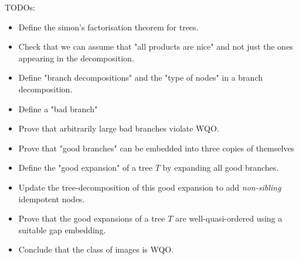 TODOs:
\begin{itemize}
    \item Define the simon's factorisation theorem for trees.
    \item Check that we can assume that "all products are nice" and not just the ones
        appearing in the decomposition.
    \item Define "branch decompositions" and the "type of nodes" in a branch decomposition.
    \item Define a "bad branch"
    \item Prove that arbitrarily large bad branches violate WQO.
    \item Prove that "good branches" can be embedded into three copies of themselves
    \item Define the "good expansion" of a tree $T$ by expanding all good branches.
    \item Update the tree-decomposition of this good expansion to add \emph{non-sibling}
        idempotent nodes.
    \item Prove that the good expansions of a tree $T$ are well-quasi-ordered using a 
        suitable gap embedding.
    \item Conclude that the class of images is WQO.
\end{itemize}

